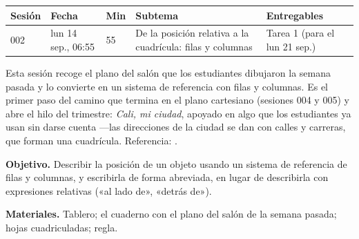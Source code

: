 \documentclass[11pt]{article}
\begin{document}
\encabezado*

\begin{center}
{\renewcommand{\arraystretch}{1.3}
\begin{tabularx}{\linewidth}{@{}l l l X l@{}}
  \toprule
  \textbf{Sesión} & \textbf{Fecha} & \textbf{Min} & \textbf{Subtema} & \textbf{Entregables}\\
  \midrule
  002 & lun 14 sep., 06:55 & 55 & De la posición relativa a la cuadrícula: filas y columnas
      & Tarea 1 (para el lun 21 sep.)\\
  \bottomrule
\end{tabularx}}
\end{center}

Esta sesión recoge el plano del salón que los estudiantes dibujaron la semana pasada y lo
convierte en un sistema de referencia con filas y columnas. Es el primer paso del camino que
termina en el plano cartesiano (sesiones 004 y 005) y abre el hilo del trimestre: \emph{Cali,
mi ciudad}, apoyado en algo que los estudiantes ya usan sin darse cuenta —las direcciones de
la ciudad se dan con calles y carreras, que forman una cuadrícula.
Referencia: .


\textbf{Objetivo.} Describir la posición de un objeto usando un sistema de referencia de
filas y columnas, y escribirla de forma abreviada, en lugar de describirla con expresiones
relativas («al lado de», «detrás de»).

\textbf{Materiales.} Tablero; el cuaderno con el plano del salón de la semana pasada; hojas
cuadriculadas; regla.
\end{document}

